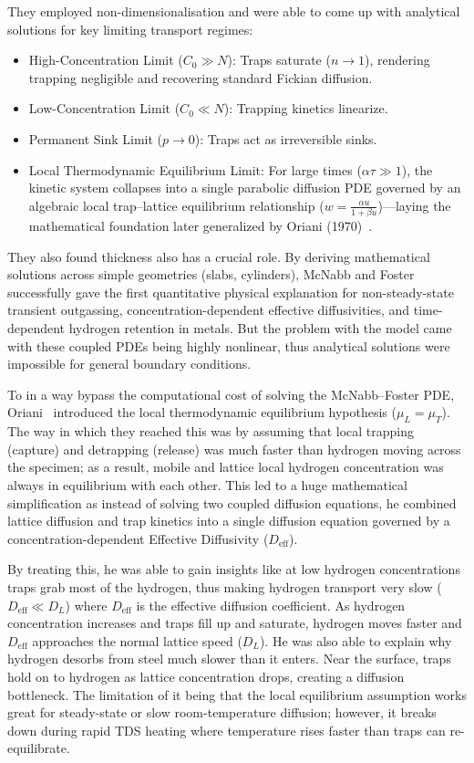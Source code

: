 \documentclass[a4paper,12pt,oneside]{report}
\begin{document}
They employed non-dimensionalisation and were able to come up with analytical solutions for key limiting transport regimes:
\begin{itemize}
    \item High-Concentration Limit ($C_0 \gg N$): Traps saturate ($n \to 1$), rendering trapping negligible and recovering standard Fickian diffusion.
    \item Low-Concentration Limit ($C_0 \ll N$): Trapping kinetics linearize.
    \item Permanent Sink Limit ($p \to 0$): Traps act as irreversible sinks.
    \item Local Thermodynamic Equilibrium Limit: For large times ($\alpha \tau \gg 1$), the kinetic system collapses into a single parabolic diffusion PDE governed by an algebraic local trap--lattice equilibrium relationship ($w = \frac{\alpha u}{1 + \beta u}$)---laying the mathematical foundation later generalized by Oriani (1970)~\cite{Oriani1970}.
\end{itemize}

They also found thickness also has a crucial role. By deriving mathematical solutions across simple geometries (slabs, cylinders), McNabb and Foster successfully gave the first quantitative physical explanation for non-steady-state transient outgassing, concentration-dependent effective diffusivities, and time-dependent hydrogen retention in metals. But the problem with the model came with these coupled PDEs being highly nonlinear, thus analytical solutions were impossible for general boundary conditions.

To in a way bypass the computational cost of solving the McNabb--Foster PDE, Oriani~\cite{Oriani1970} introduced the local thermodynamic equilibrium hypothesis ($\mu_L = \mu_T$). The way in which they reached this was by assuming that local trapping (capture) and detrapping (release) was much faster than hydrogen moving across the specimen; as a result, mobile and lattice local hydrogen concentration was always in equilibrium with each other. This led to a huge mathematical simplification as instead of solving two coupled diffusion equations, he combined lattice diffusion and trap kinetics into a single diffusion equation governed by a concentration-dependent Effective Diffusivity ($D_{\text{eff}}$).

By treating this, he was able to gain insights like at low hydrogen concentrations traps grab most of the hydrogen, thus making hydrogen transport very slow ($D_{\text{eff}} \ll D_L$) where $D_{\text{eff}}$ is the effective diffusion coefficient. As hydrogen concentration increases and traps fill up and saturate, hydrogen moves faster and $D_{\text{eff}}$ approaches the normal lattice speed ($D_L$). He was also able to explain why hydrogen desorbs from steel much slower than it enters. Near the surface, traps hold on to hydrogen as lattice concentration drops, creating a diffusion bottleneck. The limitation of it being that the local equilibrium assumption works great for steady-state or slow room-temperature diffusion; however, it breaks down during rapid TDS heating where temperature rises faster than traps can re-equilibrate.
\end{document}
